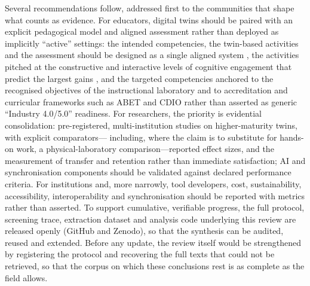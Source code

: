 Several recommendations follow, addressed first to the communities that shape what
counts as evidence. For educators, digital twins should be paired with an explicit
pedagogical model and aligned assessment rather than deployed as implicitly
``active'' settings: the intended competencies, the twin-based activities and the
assessment should be designed as a single aligned system \cite{biggs_teaching_2011},
the activities pitched at the constructive and interactive levels of cognitive
engagement that predict the largest gains \cite{chi_icap_2014}, and the targeted
competencies anchored to the recognised objectives of the instructional
laboratory \cite{feisel_role_2005} and to accreditation and curricular frameworks such
as ABET and CDIO rather than asserted as generic ``Industry 4.0/5.0'' readiness. For
researchers, the priority is evidential consolidation: pre-registered,
multi-institution studies on higher-maturity twins, with explicit comparators---
including, where the claim is to substitute for hands-on work, a physical-laboratory
comparison---reported effect sizes, and the measurement of transfer and retention
rather than immediate satisfaction; AI and synchronisation components should be
validated against declared performance criteria. For institutions and, more
narrowly, tool developers, cost, sustainability, accessibility, interoperability
and synchronisation should be reported with metrics rather than asserted. To
support cumulative, verifiable progress, the full protocol, screening trace,
extraction dataset and analysis code underlying this review are released openly
(GitHub and Zenodo), so that the synthesis can be audited, reused and extended.
Before any update, the review itself would be strengthened by registering the
protocol and recovering the full texts that could not be retrieved, so that the
corpus on which these conclusions rest is as complete as the field allows.
%
%
%
